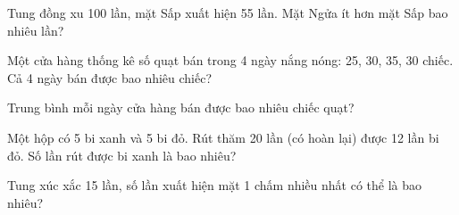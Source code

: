 \begin{ex}
Tung đồng xu 100 lần, mặt Sấp xuất hiện 55 lần. Mặt Ngửa ít hơn mặt Sấp bao nhiêu lần?
\end{ex}

\begin{ex}
Một cửa hàng thống kê số quạt bán trong 4 ngày nắng nóng: 25, 30, 35, 30 chiếc. Cả 4 ngày bán được bao nhiêu chiếc?
\end{ex}

\begin{ex}
Trung bình mỗi ngày cửa hàng bán được bao nhiêu chiếc quạt?
\end{ex}

\begin{ex}
Một hộp có 5 bi xanh và 5 bi đỏ. Rút thăm 20 lần (có hoàn lại) được 12 lần bi đỏ. Số lần rút được bi xanh là bao nhiêu?
\end{ex}

\begin{ex}
Tung xúc xắc 15 lần, số lần xuất hiện mặt 1 chấm nhiều nhất có thể là bao nhiêu?
\end{ex}
